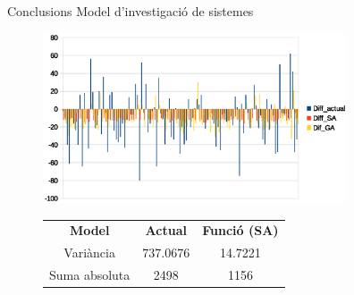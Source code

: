 \documentclass[twocolumn]{beamer}
\begin{document}
\begin{frame}{Conclusions Model d'investigació de sistemes}
\begin{figure}
\includegraphics[width=9cm]{saldo_diff_ga}
\begin{tabular}{c|c|c}
	\textbf{Model} & \textbf{Actual} & \textbf{Funció (SA)} \\
	Variància & 737.0676 & 14.7221 \\
	Suma absoluta & 2498 & 1156 \\
\end{tabular}
\end{figure}
\end{frame}
\end{document}
